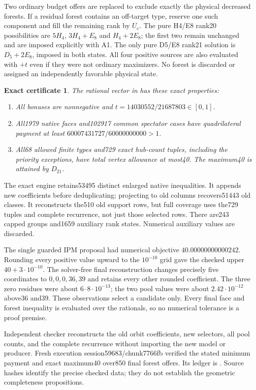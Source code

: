 \documentclass[11pt]{article}
\newtheorem{certificate}[theorem]{Exact certificate}
\begin{document}
Two ordinary budget offers are replaced to exclude exactly the physical
decreased forests. If a residual forest contains an off-target type,
reserve one such component and fill the remaining rank by $U_c$. The
pure H4/E8 rank20 possibilities are $5H_4$, $3H_4+E_8$ and $H_4+2E_8$;
the first two remain unchanged and are imposed explicitly with A1.
The only pure D5/E8 rank21 solution is $D_5+2E_8$, imposed in both
states. All four positive sources are also evaluated with $+t$ even if
they were not ordinary maximizers. No forest is discarded or assigned
an independently favorable physical state.

\begin{certificate}\label{cert:40}
The rational vector in
has these exact properties:
\begin{enumerate}
\item All bonuses are nonnegative and
$t=14030552/21687803\in[0,1]$.
\item All1979 native faces and102917 common spectator cases have
quadrilateral payment at least $60007431727/60000000000>1$.
\item All68 allowed finite types and729 exact hub-count tuples, including
the priority exceptions, have total vertex allowance at most40.
The maximum40 is attained by $D_{21}$.
\end{enumerate}
\end{certificate}
The exact engine retains53495 distinct enlarged native inequalities.
It appends new coefficients before deduplicating; projecting to old
columns recovers51443 old classes. It reconstructs the510 old support
rows, but full coverage uses the729 tuples and complete recurrence,
not just those selected rows. There are243 capped groups and1659
auxiliary rank states. Numerical auxiliary values are discarded.

The single guarded IPM proposal had numerical objective
$40.00000000000242$. Rounding every positive value upward to the
$10^{-10}$ grid gave the checked upper $40+3\cdot10^{-10}$.
The solver-free final reconstruction changes precisely five coordinates
to $0,0,0,36,39$ and retains every other rounded coefficient. The three
zero residues were about $6$--$8\cdot10^{-13}$; the two pool values were
about $2.42\cdot10^{-12}$ above36 and39. These observations select a
candidate only. Every final face and forest inequality is evaluated over
the rationals, so no numerical tolerance is a proof premise.

Independent checker
reconstructs the old orbit coefficients, new selectors, all pool counts,
and the complete recurrence without importing the new model or producer.
Fresh execution session59683/chunk7766fb verified the stated minimum
payment and exact maximum40 over850 final forest offers. Its ledger is
.
Source hashes identify the precise checked data; they do not establish
the geometric completeness propositions.
\end{document}
